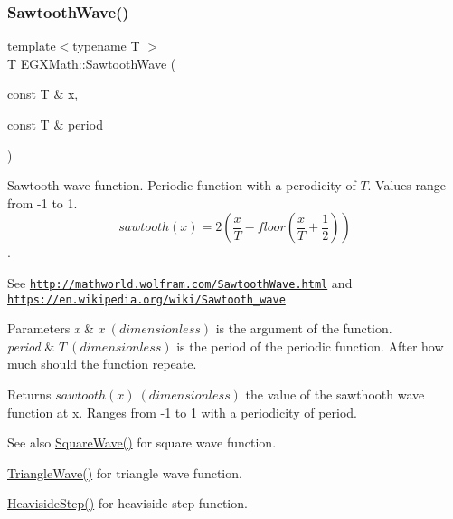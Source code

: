 \subsubsection{\texorpdfstring{Sawtooth\+Wave()}{SawtoothWave()}}
{\footnotesize\ttfamily template$<$typename T $>$ \\
T E\+G\+X\+Math\+::\+Sawtooth\+Wave (\begin{DoxyParamCaption}\item[{const T \&}]{x,  }\item[{const T \&}]{period }\end{DoxyParamCaption})}



Sawtooth wave function. Periodic function with a perodicity of $T$. Values range from -\/1 to 1. \[sawtooth(x)=2(\frac{x}{T} - floor(\frac{x}{T} + \frac{1}{2}))\]. 

See \href{http://mathworld.wolfram.com/SawtoothWave.html}{\tt http\+://mathworld.\+wolfram.\+com/\+Sawtooth\+Wave.\+html} and \href{https://en.wikipedia.org/wiki/Sawtooth_wave}{\tt https\+://en.\+wikipedia.\+org/wiki/\+Sawtooth\+\_\+wave} 
\begin{DoxyParams}{Parameters}
{\em x} & $x\ (dimensionless)$ is the argument of the function. \\
\hline
{\em period} & $T\ (dimensionless)$ is the period of the periodic function. After how much should the function repeate. \\
\hline
\end{DoxyParams}
\begin{DoxyReturn}{Returns}
$sawtooth(x)\ (dimensionless)$ the value of the sawthooth wave function at x. Ranges from -\/1 to 1 with a periodicity of period. 
\end{DoxyReturn}
\begin{DoxySeeAlso}{See also}
\mbox{\hyperlink{group___e_g_x_math-_functions-_periodic_ga3bdc6c02d347f48f91bca886448db33a}{Square\+Wave()}} for square wave function. 

\mbox{\hyperlink{group___e_g_x_math-_functions-_periodic_gafa81ebd66ef7cd080370fad972d6ac50}{Triangle\+Wave()}} for triangle wave function. 

\mbox{\hyperlink{group___e_g_x_math-_functions-_periodic_ga0fb325d5423606e9c222e1ebd6a65833}{Heaviside\+Step()}} for heaviside step function. 
\end{DoxySeeAlso}
\mbox{\label{group___e_g_x_math-_functions-_periodic_ga3bdc6c02d347f48f91bca886448db33a}} 
